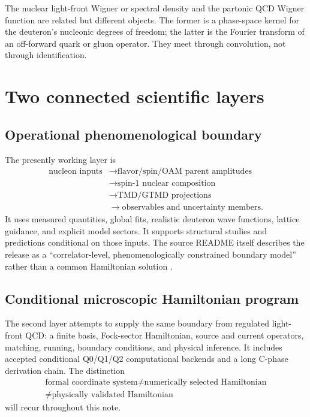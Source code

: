 \documentclass[11pt,oneside]{book}
\begin{document}
The nuclear light-front Wigner or spectral density and the partonic QCD Wigner function are related but different objects.  The former is a phase-space kernel for the deuteron's nucleonic degrees of freedom; the latter is the Fourier transform of an off-forward quark or gluon operator.  They meet through convolution, not through identification.

\section{Two connected scientific layers}

\subsection{Operational phenomenological boundary}

The presently working layer is
\begin{equation}
 \begin{aligned}
 \text{nucleon inputs}
 &\longrightarrow \text{flavor/spin/OAM parent amplitudes}\\
 &\longrightarrow \text{spin-1 nuclear composition}\\
 &\longrightarrow \text{TMD/GTMD projections}\\
 &\longrightarrow \text{observables and uncertainty members}.
 \end{aligned}
 \label{eq:boundary-pipeline}
\end{equation}
It uses measured quantities, global fits, realistic deuteron wave functions, lattice guidance, and explicit model sectors.  It supports structural studies and predictions conditional on those inputs.  The source README itself describes the release as a ``correlator-level, phenomenologically constrained boundary model'' rather than a common Hamiltonian solution \cite{DeuteronWignerRepo2026,DWProductionBoundary2026}.

\subsection{Conditional microscopic Hamiltonian program}

The second layer attempts to supply the same boundary from regulated light-front QCD: a finite basis, Fock-sector Hamiltonian, source and current operators, matching, running, boundary conditions, and physical inference.  It includes accepted conditional Q0/Q1/Q2 computational backends and a long C-phase derivation chain.  The distinction
\begin{equation}
 \boxed{\begin{gathered}
 \text{formal coordinate system}\neq\text{numerically selected Hamiltonian}\\
 \neq\text{physically validated Hamiltonian}
 \end{gathered}}
 \label{eq:three-hamiltonian-levels}
\end{equation}
will recur throughout this note.
\end{document}

